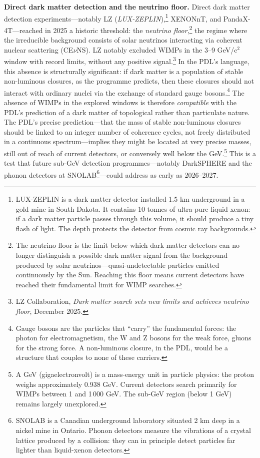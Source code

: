 \documentclass[12pt, a4paper, openright]{book}
\begin{document}
\textbf{Direct dark matter detection and the neutrino floor.} Direct dark matter detection experiments---notably LZ (\textit{LUX-ZEPLIN}),\footnote{LUX-ZEPLIN is a dark matter detector installed 1.5 km underground in a gold mine in South Dakota. It contains 10 tonnes of ultra-pure liquid xenon: if a dark matter particle passes through this volume, it should produce a tiny flash of light. The depth protects the detector from cosmic ray backgrounds.} XENONnT, and PandaX-4T---reached in 2025 a historic threshold: the \emph{neutrino floor},\footnote{The neutrino floor is the limit below which dark matter detectors can no longer distinguish a possible dark matter signal from the background produced by solar neutrinos---quasi-undetectable particles emitted continuously by the Sun. Reaching this floor means current detectors have reached their fundamental limit for WIMP searches.} the regime where the irreducible background consists of solar neutrinos interacting via coherent nuclear scattering (CE$\nu$NS). LZ notably excluded WIMPs in the 3--9 GeV/c$^2$ window with record limits, without any positive signal.\footnote{LZ Collaboration, \textit{Dark matter search sets new limits and achieves neutrino floor}, December 2025.} In the PDL's language, this absence is structurally significant: if dark matter is a population of stable non-luminous closures, as the programme predicts, then these closures should not interact with ordinary nuclei via the exchange of standard gauge bosons.\footnote{Gauge bosons are the particles that ``carry'' the fundamental forces: the photon for electromagnetism, the W and Z bosons for the weak force, gluons for the strong force. A non-luminous closure, in the PDL, would be a structure that couples to none of these carriers.} The absence of WIMPs in the explored windows is therefore \emph{compatible} with the PDL's prediction of a dark matter of topological rather than particulate nature. The PDL's precise prediction---that the mass of stable non-luminous closures should be linked to an integer number of coherence cycles, not freely distributed in a continuous spectrum---implies they might be located at very precise masses, still out of reach of current detectors, or conversely well below the GeV.\footnote{A GeV (gigaelectronvolt) is a mass-energy unit in particle physics: the proton weighs approximately 0.938 GeV. Current detectors search primarily for WIMPs between 1 and 1\,000 GeV. The sub-GeV region (below 1 GeV) remains largely unexplored.} This is a test that future sub-GeV detection programmes---notably DarkSPHERE and the phonon detectors at SNOLAB\footnote{SNOLAB is a Canadian underground laboratory situated 2 km deep in a nickel mine in Ontario. Phonon detectors measure the vibrations of a crystal lattice produced by a collision: they can in principle detect particles far lighter than liquid-xenon detectors.}---could address as early as 2026--2027.
\end{document}
